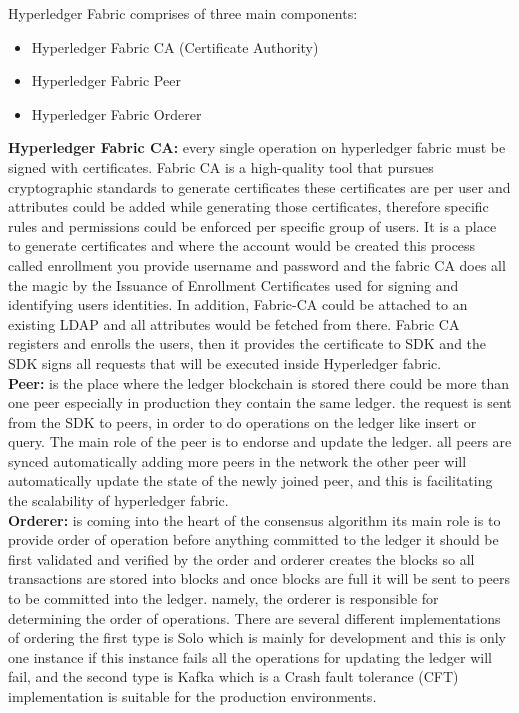 Hyperledger Fabric comprises of three main components:
\begin{itemize}
  \item Hyperledger Fabric CA (Certificate Authority) 
  \item Hyperledger Fabric Peer 
  \item Hyperledger  Fabric Orderer 
\end{itemize} 
\bigskip
\textbf{Hyperledger Fabric CA:} every single operation on hyperledger fabric must be signed with certificates.
Fabric CA is a high-quality tool that pursues cryptographic standards to generate certificates these certificates are per user and attributes could be added while generating those certificates, therefore specific rules and permissions could be enforced per specific group of users. 
It is a place to generate certificates and where the account would be created this process called enrollment you provide username and password and the fabric CA does all the magic by the Issuance of Enrollment Certificates used for signing and identifying users identities. 
In addition, Fabric-CA could be attached to an existing LDAP and all attributes would be fetched from there. 
Fabric CA registers and enrolls the users, then it provides the certificate to SDK and the SDK signs all requests that will be executed inside Hyperledger fabric. \\ 

\textbf{Peer:} is the place where the ledger blockchain is stored there could be more than one peer especially in production they contain the same ledger.  the request is sent from the SDK to peers, in order to do operations on the ledger like insert or query.  The main role of the peer is to endorse and update the ledger. all peers are synced automatically adding more peers in the network the other peer will automatically update the state of the newly joined peer, and this is facilitating the scalability of hyperledger fabric.  \\ 

\textbf{Orderer:} is coming into the heart of the consensus algorithm its main role is to provide order of operation before anything committed to the ledger it should be first validated and verified by the order and orderer creates the blocks so all transactions are stored into blocks and once blocks are full it will be sent to peers to be committed into the ledger. namely, the orderer is responsible for determining the order of operations.
There are several different implementations of ordering the first type is Solo which is mainly for development and this is only one instance if this instance fails all the operations for updating the ledger will fail, and the second type is Kafka which is a Crash fault tolerance (CFT) implementation is suitable for the production environments.\\

